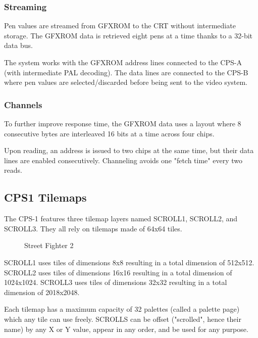 \subsubsection{Streaming}
Pen values are streamed from GFXROM to the CRT without intermediate storage. The GFXROM data is retrieved eight pens at a time thanks to a 32-bit data bus.

The system works with the GFXROM address lines connected to the CPS-A (with intermediate PAL decoding). The data lines are connected to the CPS-B where pen values are selected/discarded before being sent to the video system.

 \begin{figure}[H]%
 \end{figure}%


\subsubsection{Channels}
To further improve response time, the GFXROM data uses a layout where 8 consecutive bytes are interleaved 16 bits at a time across four chips. 

Upon reading, an address is issued to two chips at the same time, but their data lines are enabled consecutively. Channeling avoids one "fetch time" every two reads.



\subsection{CPS1 Tilemaps}
The CPS-1 features three tilemap layers named SCROLL1, SCROLL2, and SCROLL3. They all rely on tilemaps made of 64x64 tiles.


\vfill
\begin{figure}[!b]
 \caption*{Street Fighter 2}%
 \end{figure}%
\pagebreak

SCROLL1 uses tiles of dimensions 8x8 resulting in a total dimension of 512x512. SCROLL2 uses tiles of dimensions 16x16 resulting in a total dimension of 1024x1024. SCROLL3 uses tiles of dimensions 32x32 resulting in a total dimension of 2018x2048.

Each tilemap has a maximum capacity of 32 palettes (called a palette page) which any tile can use freely. SCROLLS can be offset ("scrolled", hence their name) by any X or Y value, appear in any order, and be used for any purpose.


